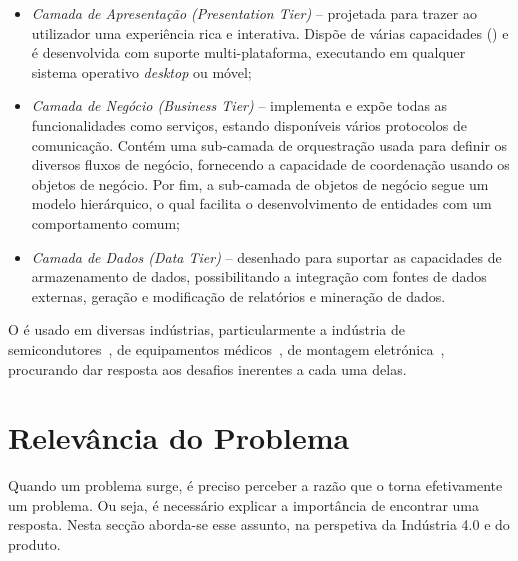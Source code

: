 \begin{itemize}
    \item 
    {
        \textit{Camada de Apresentação (Presentation Tier)} -- projetada para trazer ao utilizador uma experiência rica e interativa. Dispõe de várias capacidades () e é desenvolvida com suporte multi-plataforma, executando em qualquer sistema operativo \textit{desktop} ou móvel;
    }
    \item
    {
        \textit{Camada de Negócio (Business Tier)} -- implementa e expõe todas as funcionalidades como serviços, estando disponíveis vários protocolos de comunicação. Contém uma sub-camada de orquestração usada para definir os diversos fluxos de negócio, fornecendo a capacidade de coordenação usando os objetos de negócio. Por fim, a sub-camada de objetos de negócio segue um modelo hierárquico, o qual facilita o desenvolvimento de entidades com um comportamento comum;
    }
    \item
    {
        \textit{Camada de Dados (Data Tier)} -- desenhado para suportar as capacidades de armazenamento de dados, possibilitando a integração com fontes de dados externas, geração e modificação de relatórios e mineração de dados.
    }
\end{itemize}

O {\productname} é usado em diversas indústrias, particularmente a indústria de semicondutores~\parencite{cmf_industries_semiconductor}, de equipamentos médicos~\parencite{cmf_industries_medical_devices}, de montagem eletrónica~\parencite{cmf_industries_electronics}, procurando dar resposta aos desafios inerentes a cada uma delas.

\section{Relevância do Problema}
\label{sec:chap02_relevance}
Quando um problema surge, é preciso perceber a razão que o torna efetivamente um problema. Ou seja, é necessário explicar a importância de encontrar uma resposta. Nesta secção aborda-se esse assunto, na perspetiva da Indústria 4.0 e do produto.

